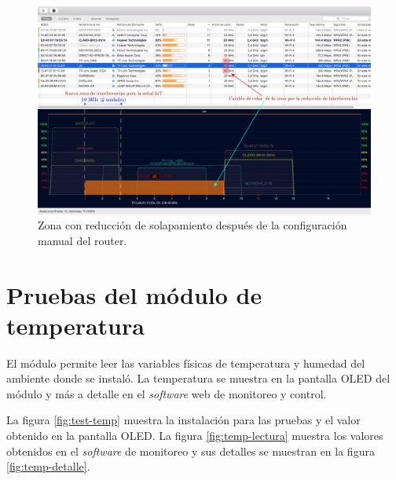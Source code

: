 
\begin{landscape} %
\begin{figure}[htpb]
\centering 
\includegraphics[width=1.5\textwidth]{./Figures/wifi/06.png}
\caption{Zona con reducción de solapamiento después de la configuración manual del router.}
\label{fig:test06}
\end{figure}
\end{landscape} %


\section{Pruebas del módulo de temperatura}

El módulo permite leer las variables físicas de temperatura y humedad del ambiente donde se instaló. La temperatura se muestra en la pantalla OLED del módulo y más a detalle en el \emph{software} web de monitoreo y control.

La figura \ref{fig:test-temp} muestra la instalación para las pruebas y el valor obtenido en la pantalla OLED. La figura \ref{fig:temp-lectura} muestra los valores obtenidos en el \emph{software} de monitoreo y sus detalles se muestran en la figura \ref{fig:temp-detalle}.

